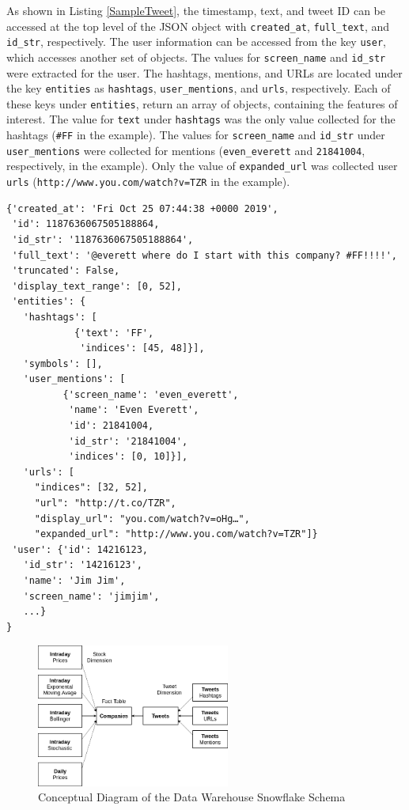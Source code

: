 \documentclass[journal]{IEEEtran}
\begin{document}
As shown in Listing \ref{SampleTweet}, the timestamp, text, and tweet ID
 can be accessed at the top level of the JSON object with \texttt{created\_at},
 \texttt{full\_text}, and \texttt{id\_str}, respectively. 
The user information can be accessed from the key \texttt{user}, 
 which accesses another set of objects. 
The values for \texttt{screen\_name} and \texttt{id\_str} were extracted for the user.
The hashtags, mentions, and URLs are located under the key \texttt{entities} as
 \texttt{hashtags}, \texttt{user\_mentions}, and \texttt{urls}, respectively.
Each of these keys under \texttt{entities}, return an array of objects,
 containing the features of interest. 
The value for \texttt{text} under \texttt{hashtags} was the only value collected
 for the hashtags (\texttt{\#FF} in the example).
The values for \texttt{screen\_name} and \texttt{id\_str} under 
 \texttt{user\_mentions} were collected for mentions (\texttt{even\_everett} and
 \texttt{21841004}, respectively, in the example).
Only the value of \texttt{expanded\_url} was collected user \texttt{urls}
 (\texttt{http://www.you.com/watch?v=TZR} in the example).


\begin{lstlisting}[frame=single,
 caption={Sample Tweet JSON},
 label={SampleTweet}]
{'created_at': 'Fri Oct 25 07:44:38 +0000 2019',
 'id': 1187636067505188864,
 'id_str': '1187636067505188864',
 'full_text': '@everett where do I start with this company? #FF!!!!',
 'truncated': False,
 'display_text_range': [0, 52],
 'entities': {
   'hashtags': [
            {'text': 'FF',
             'indices': [45, 48]}],
   'symbols': [],
   'user_mentions': [
          {'screen_name': 'even_everett',
           'name': 'Even Everett',
           'id': 21841004,
           'id_str': '21841004',
           'indices': [0, 10]}],
   'urls': [
     "indices": [32, 52],
     "url": "http://t.co/TZR",
     "display_url": "you.com/watch?v=oHg…",
     "expanded_url": "http://www.you.com/watch?v=TZR"]}
 'user': {'id': 14216123,
   'id_str': '14216123',
   'name': 'Jim Jim',
   'screen_name': 'jimjim',
   ...}
}
\end{lstlisting}

\begin{figure}
	\centering
	\includegraphics[width=2.5in]{SnowFlake_Schema_Simple.png}
	\caption{Conceptual Diagram of the Data Warehouse Snowflake Schema}
	\label{snowflake}
\end{figure}
\end{document}
